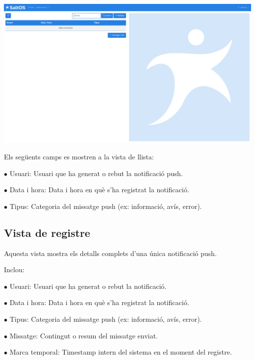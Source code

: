 \documentclass[a4paper]{article}
\begin{document}
\begin{center}\includegraphics[width=1\textwidth]{../ujest/snaps/test-screenshots-js-screenshots-common-pushlog-list-ca-es-1-snap.png}\end{center}

Els següents camps es mostren a la vista de llista:

\begin{compactitem}
\item[\color{myblue}$\bullet$] Usuari: Usuari que ha generat o rebut la notificació push.
\item[\color{myblue}$\bullet$] Data i hora: Data i hora en què s'ha registrat la notificació.
\item[\color{myblue}$\bullet$] Tipus: Categoria del missatge push (ex: informació, avís, error).
\end{compactitem}

\hypertarget{toc24}{}
\subsection{Vista de registre}

Aquesta vista mostra els detalls complets d'una única notificació push.

Inclou:

\begin{compactitem}
\item[\color{myblue}$\bullet$] Usuari: Usuari que ha generat o rebut la notificació.
\item[\color{myblue}$\bullet$] Data i hora: Data i hora en què s'ha registrat la notificació.
\item[\color{myblue}$\bullet$] Tipus: Categoria del missatge push (ex: informació, avís, error).
\item[\color{myblue}$\bullet$] Missatge: Contingut o resum del missatge enviat.
\item[\color{myblue}$\bullet$] Marca temporal: Timestamp intern del sistema en el moment del registre.
\end{compactitem}
\end{document}
